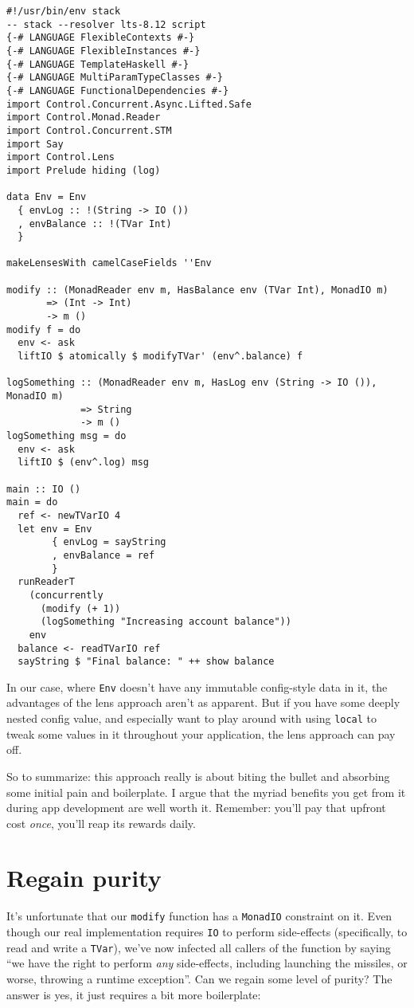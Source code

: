 \begin{verbatim}
#!/usr/bin/env stack
-- stack --resolver lts-8.12 script
{-# LANGUAGE FlexibleContexts #-}
{-# LANGUAGE FlexibleInstances #-}
{-# LANGUAGE TemplateHaskell #-}
{-# LANGUAGE MultiParamTypeClasses #-}
{-# LANGUAGE FunctionalDependencies #-}
import Control.Concurrent.Async.Lifted.Safe
import Control.Monad.Reader
import Control.Concurrent.STM
import Say
import Control.Lens
import Prelude hiding (log)

data Env = Env
  { envLog :: !(String -> IO ())
  , envBalance :: !(TVar Int)
  }

makeLensesWith camelCaseFields ''Env

modify :: (MonadReader env m, HasBalance env (TVar Int), MonadIO m)
       => (Int -> Int)
       -> m ()
modify f = do
  env <- ask
  liftIO $ atomically $ modifyTVar' (env^.balance) f

logSomething :: (MonadReader env m, HasLog env (String -> IO ()), MonadIO m)
             => String
             -> m ()
logSomething msg = do
  env <- ask
  liftIO $ (env^.log) msg

main :: IO ()
main = do
  ref <- newTVarIO 4
  let env = Env
        { envLog = sayString
        , envBalance = ref
        }
  runReaderT
    (concurrently
      (modify (+ 1))
      (logSomething "Increasing account balance"))
    env
  balance <- readTVarIO ref
  sayString $ "Final balance: " ++ show balance
\end{verbatim}
In our case, where \texttt{Env} doesn't have any immutable config-style
data in it, the advantages of the lens approach aren't as apparent. But
if you have some deeply nested config value, and especially want to play
around with using \texttt{local} to tweak some values in it throughout
your application, the lens approach can pay off.

So to summarize: this approach really is about biting the bullet and
absorbing some initial pain and boilerplate. I argue that the myriad
benefits you get from it during app development are well worth it.
Remember: you'll pay that upfront cost \emph{once}, you'll reap its
rewards daily.

\section{Regain purity}

It's unfortunate that our \texttt{modify} function has a
\texttt{MonadIO} constraint on it. Even though our real implementation
requires \texttt{IO} to perform side-effects (specifically, to read and
write a \texttt{TVar}), we've now infected all callers of the function
by saying ``we have the right to perform \emph{any} side-effects,
including launching the missiles, or worse, throwing a runtime
exception''. Can we regain some level of purity? The answer is yes, it
just requires a bit more boilerplate:

